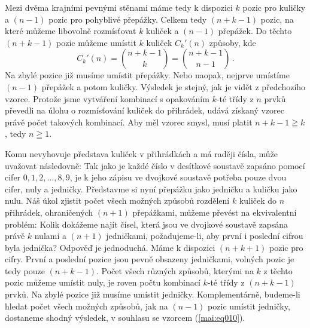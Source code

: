 \begin{mdframed}[style=mdexam]
\begin{example}
    Mezi dvěma krajními pevnými stěnami máme tedy k dispozici \(k\) pozic pro kuličky a \((n - 1)\)
    pozic pro pohyblivé přepážky. Celkem tedy \((n + k - 1)\) pozic, na které můžeme libovolně
    rozmísťovat \(k\) kuliček a \((n - 1)\) přepážek. Do těchto \((n + k - 1)\) pozic můžeme umístit
    \(k\) kuliček \(C_k'(n)\) způsoby, kde
    \begin{equation}\label{MAI:eq011}
      \boxed{C_k'(n) =  \binom{n + k - 1}{k} = \binom{n + k - 1}{n -1}}\, .
    \end{equation}
    Na zbylé pozice již musíme umístit přepážky. Nebo naopak, nejprve umístíme \((n - 1)\) přepážek
    a potom kuličky. Výsledek je stejný, jak je vidět z předchozího vzorce. Protože jsme vytváření
    kombinací s opakováním \(k\)-té třídy z \(n\) prvků převedli na úlohu o rozmísťování kuliček do
    přihrádek, udává získaný vzorec právě počet takových kombinací. Aby měl vzorec smysl, musí
    platit \(n + k - 1 \geqq k\), tedy \(n \geqq 1\).

    Komu nevyhovuje představa kuliček v přihrádkách a má raději čísla, může uvažovat následovně: Tak
    jako je každé číslo v desítkové soustavě zapsáno pomocí cifer \(0, 1, 2, \ldots , 8, 9\), je k
    jeho zápisu ve dvojkové soustavě potřeba pouze dvou cifer, nuly a jedničky. Představme si nyní
    přepážku jako jedničku a kuličku jako nulu. Náš úkol zjistit počet všech možných způsobů
    rozdělení \(k\) kuliček do \(n\) přihrádek, ohraničených \((n+1)\) přepážkami, můžeme převést na
    ekvivalentní problém: Kolik dokážeme najít čísel, která jsou ve dvojkové soustavě zapsána právě
    \(k\) nulami a \((n + 1)\) jedničkami, požadujeme-li, aby první i poslední cifrou byla jednička?
    Odpověď je jednoduchá. Máme k dispozici \((n+k+1)\) pozic pro cifry. První a poslední pozice
    jsou pevně obsazeny jedničkami, volných pozic je tedy pouze \((n + k - 1)\). Počet všech různých
    způsobů, kterými na \(k\) z těchto pozic můžeme umístit nuly, je roven počtu kombinací \(k\)-té
    třídy z \((n + k - 1)\) prvků. Na zbylé pozice již musíme umístit jedničky. Komplementárně,
    budeme-li hledat počet všech možných způsobů, jak na \((n-1)\) pozic umístit jedničky, dostaneme
    shodný výsledek, v souhlasu se vzorcem (\ref{mai:eq010}).
  \end{example}
\end{mdframed}